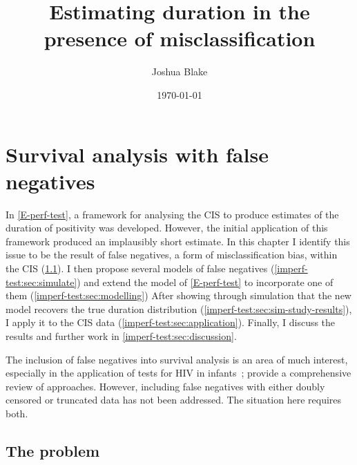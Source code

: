 \documentclass[thesis.tex]{subfiles}
\title{Estimating duration in the presence of misclassification}
\author{Joshua Blake}
\date{\today}
\begin{document}
\ifSubfilesClassLoaded{
  \setcounter{chapter}{5}
}

\chapter{Survival analysis with false negatives} \label{imperf-test}

In \cref{E-perf-test}, a framework for analysing the CIS to produce estimates of the duration of positivity was developed.
However, the initial application of this framework produced an implausibly short estimate.
In this chapter I identify this issue to be the result of false negatives, a form of misclassification bias, within the CIS (\cref{imperf-test:sec:problem}).
I then propose several models of false negatives (\cref{imperf-test:sec:simulate}) and extend the model of \cref{E-perf-test} to incorporate one of them (\cref{imperf-test:sec:modelling})
After showing through simulation that the new model recovers the true duration distribution (\cref{imperf-test:sec:sim-study-results}), I apply it to the CIS data (\cref{imperf-test:sec:application}).
Finally, I discuss the results and further work in \cref{imperf-test:sec:discussion}.

The inclusion of false negatives into survival analysis is an area of much interest, especially in the application of tests for HIV in infants~\autocite[e.g.][]{brownBayesian,balasubramanianEstimation};
\textcite{piresIntervalMisclassify} provide a comprehensive review of approaches.
However, including false negatives with either doubly censored or truncated data has not been addressed.
The situation here requires both.



\section{The problem} \label{imperf-test:sec:problem}
\end{document}
